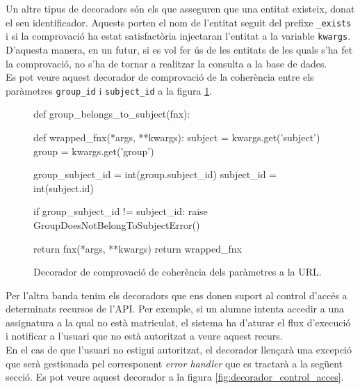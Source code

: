 Un altre tipus de decoradors són els que asseguren que una entitat existeix, donat el seu identificador. Aquests porten el nom de l'entitat seguit del prefixe \texttt{\_exists} i si la comprovació ha estat satisfactòria injectaran l'entitat a la variable \texttt{kwargs}. D'aquesta manera, en un futur, si es vol fer ús de les entitats de les quals s'ha fet la comprovació, no s'ha de tornar a realitzar la consulta a la base de dades.\\

Es pot veure aquest decorador de comprovació de la coherència entre els paràmetres \texttt{group\_id} i \texttt{subject\_id} a la figura \ref{fig:decorador_coherencia}.\\

\begin{figure}[h!]
	\begin{python}
def group_belongs_to_subject(fnx):

	def wrapped_fnx(*args, **kwargs):
		subject = kwargs.get('subject')
		group = kwargs.get('group')
		
		group_subject_id = int(group.subject_id)
		subject_id = int(subject.id)
		
		if group_subject_id != subject_id:
			raise GroupDoesNotBelongToSubjectError()
		
		return fnx(*args, **kwargs)
	return wrapped_fnx
	\end{python}
	\caption{Decorador de comprovació de coherència dels paràmetres a la \ac{URL}.}
	\label{fig:decorador_coherencia}
\end{figure}

Per l'altra banda tenim els decoradors que ens donen suport al control d'accés a determinats recursos de l'\ac{API}. Per exemple, si un alumne intenta accedir a una assignatura a la qual no està matriculat, el sistema ha d'aturar el flux d'execució i notificar a l'usuari que no està autoritzat a veure aquest recurs. \\

En el cas de que l'usuari no estigui autoritzat, el decorador llençarà una excepció que serà gestionada pel corresponent \emph{error handler} que es tractarà a la següent secció. Es pot veure aquest decorador a la figura \ref{fig:decorador_control_acces}.\\

